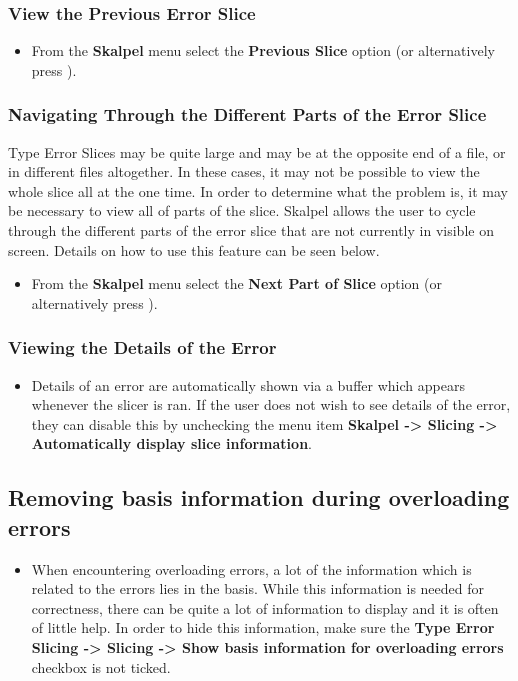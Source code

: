 \documentclass{report}
\begin{document}
\subsubsection{View the Previous Error Slice}

\begin{itemize}
\item From the \textbf{Skalpel} menu select the \textbf{Previous Slice}
  option (or alternatively press ).
\end{itemize}

\subsubsection{Navigating Through the Different Parts of the Error Slice}
Type Error Slices may be quite large and may be at the opposite end of
a file, or in different files altogether. In these cases, it may not
be possible to view the whole slice all at the one time. In order to
determine what the problem is, it may be necessary to view all of
parts of the slice. Skalpel allows the user to cycle
through the different parts of the error slice that are not currently
in visible on screen. Details on how to use this feature can be seen below.

\begin{itemize}
\item From the \textbf{Skalpel} menu select the \textbf{Next Part of
  Slice} option (or alternatively press ).
\end{itemize}

\subsubsection{Viewing the Details of the Error}

\begin{itemize}
\item Details of an error are automatically shown via a buffer which
  appears whenever the slicer is ran. If the user does not wish to see
  details of the error, they can disable this by unchecking the menu
  item \textbf{Skalpel -> Slicing -> Automatically display
    slice information}.
\end{itemize}

\subsection{Removing basis information during overloading errors}
\begin{itemize}
\item When encountering overloading errors, a lot of the information
  which is related to the errors lies in the basis. While this
  information is needed for correctness, there can be quite a lot of
  information to display and it is often of little help. In order to
  hide this information, make sure the \textbf{Type Error Slicing ->
    Slicing -> Show basis information for overloading errors} checkbox
  is not ticked.
\end{itemize}
\end{document}
